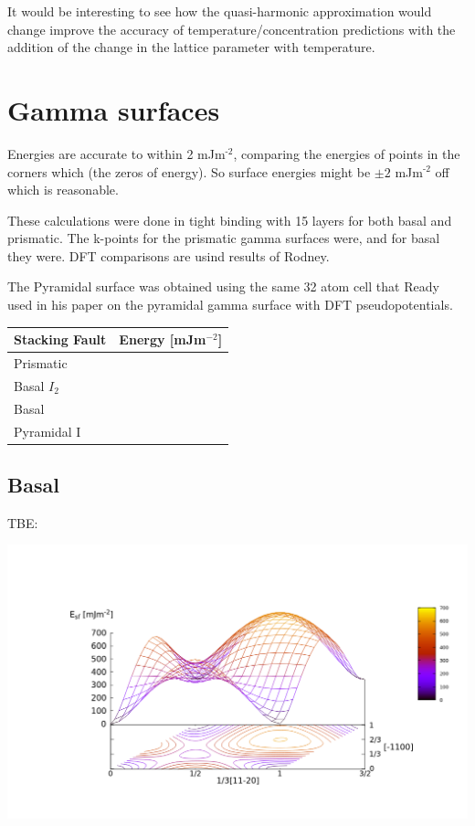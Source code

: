 \documentclass[11pt]{article}
\begin{document}
It would be interesting to see how the quasi-harmonic approximation
would change improve the accuracy of temperature/concentration
predictions with the addition of the change in the lattice parameter
with temperature. 

\section{Gamma surfaces}
\label{sec:org6bdf094}

Energies are accurate to within 2 mJm\(^{\text{-2}}\), comparing the energies of
points in the corners which (the zeros of energy). So surface energies
might be \(\pm 2\) mJm\(^{\text{-2}}\) off which is reasonable. 

These calculations were done in tight binding with 15 layers for both
basal and prismatic. The k-points for the prismatic gamma surfaces were, and for basal they were. 
DFT comparisons are usind results of Rodney. 

The Pyramidal surface was obtained using the same 32 atom cell that
Ready used in his paper on the pyramidal gamma surface with DFT
pseudopotentials. 

\begin{center}
\begin{tabular}{ll}
Stacking Fault & Energy [mJm\(^{-2}\)]\\
\hline
Prismatic & \\
Basal \(I_2\) & \\
Basal & \\
Pyramidal I & \\
\end{tabular}
\end{center}

\newpage
\subsection{Basal}
\label{sec:orgd3ad4b5}

TBE:
\begin{center}
\includegraphics[width=.9\linewidth]{Images/basal_gamma_surface_final_model_2020-01-15.png}
\end{center}
\end{document}
